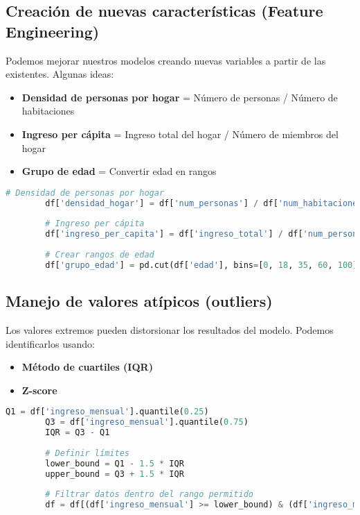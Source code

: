 \documentclass{book}
\begin{document}
	\subsection{Creación de nuevas características (Feature Engineering)}
	
	Podemos mejorar nuestros modelos creando nuevas variables a partir de las existentes. Algunas ideas:
	
	\begin{itemize}
		\item \textbf{Densidad de personas por hogar} = Número de personas / Número de habitaciones
		\item \textbf{Ingreso per cápita} = Ingreso total del hogar / Número de miembros del hogar
		\item \textbf{Grupo de edad} = Convertir edad en rangos
	\end{itemize}
	
	\begin{lstlisting}[language=Python, caption=Creación de nuevas características]
		# Densidad de personas por hogar
		df['densidad_hogar'] = df['num_personas'] / df['num_habitaciones']
		
		# Ingreso per cápita
		df['ingreso_per_capita'] = df['ingreso_total'] / df['num_personas']
		
		# Crear rangos de edad
		df['grupo_edad'] = pd.cut(df['edad'], bins=[0, 18, 35, 60, 100], labels=['Joven', 'Adulto', 'Maduro', 'Mayor'])
	\end{lstlisting}
	
	\subsection{Manejo de valores atípicos (outliers)}
	
	Los valores extremos pueden distorsionar los resultados del modelo. Podemos identificarlos usando:
	
	\begin{itemize}
		\item \textbf{Método de cuartiles (IQR)}
		\item \textbf{Z-score}
	\end{itemize}
	
	\begin{lstlisting}[language=Python, caption=Eliminación de outliers con IQR]
		Q1 = df['ingreso_mensual'].quantile(0.25)
		Q3 = df['ingreso_mensual'].quantile(0.75)
		IQR = Q3 - Q1
		
		# Definir límites
		lower_bound = Q1 - 1.5 * IQR
		upper_bound = Q3 + 1.5 * IQR
		
		# Filtrar datos dentro del rango permitido
		df = df[(df['ingreso_mensual'] >= lower_bound) & (df['ingreso_mensual'] <= upper_bound)]
	\end{lstlisting}
	
\end{document}
